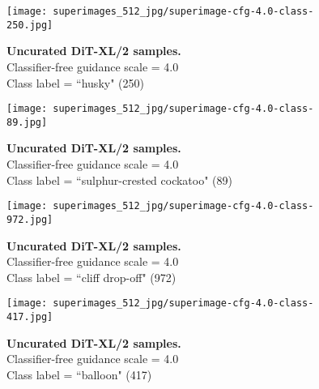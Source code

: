 \documentclass[10pt,twocolumn,letterpaper]{article}
\begin{document}
\clearpage
\pagestyle{fancy}
\fancyhead{}

\begin{figure}\centering
\texttt{[image: superimages\_512\_jpg/superimage-cfg-4.0-class-250.jpg]}
\caption{\textbf{Uncurated  DiT-XL/2 samples.} \\Classifier-free guidance scale = 4.0\\Class label = ``husky" (250)}\vspace{-2mm}
\label{fig:samples512_3}
\end{figure}

\begin{figure}\centering
\texttt{[image: superimages\_512\_jpg/superimage-cfg-4.0-class-89.jpg]}
\caption{\textbf{Uncurated  DiT-XL/2 samples.} \\Classifier-free guidance scale = 4.0\\Class label = ``sulphur-crested cockatoo" (89)}\vspace{-2mm}
\label{fig:samples512_4}
\end{figure}

\clearpage
\pagestyle{fancy}
\fancyhead{}

\begin{figure}\centering
\texttt{[image: superimages\_512\_jpg/superimage-cfg-4.0-class-972.jpg]}
\caption{\textbf{Uncurated  DiT-XL/2 samples.} \\Classifier-free guidance scale = 4.0\\Class label = ``cliff drop-off" (972)}\vspace{-2mm}
\label{fig:samples512_5}
\end{figure}

\begin{figure}\centering
\texttt{[image: superimages\_512\_jpg/superimage-cfg-4.0-class-417.jpg]}
\caption{\textbf{Uncurated  DiT-XL/2 samples.} \\Classifier-free guidance scale = 4.0\\Class label = ``balloon" (417)}\vspace{-2mm}
\label{fig:samples512_6}
\end{figure}

\clearpage
\pagestyle{fancy}
\fancyhead{}
\end{document}
